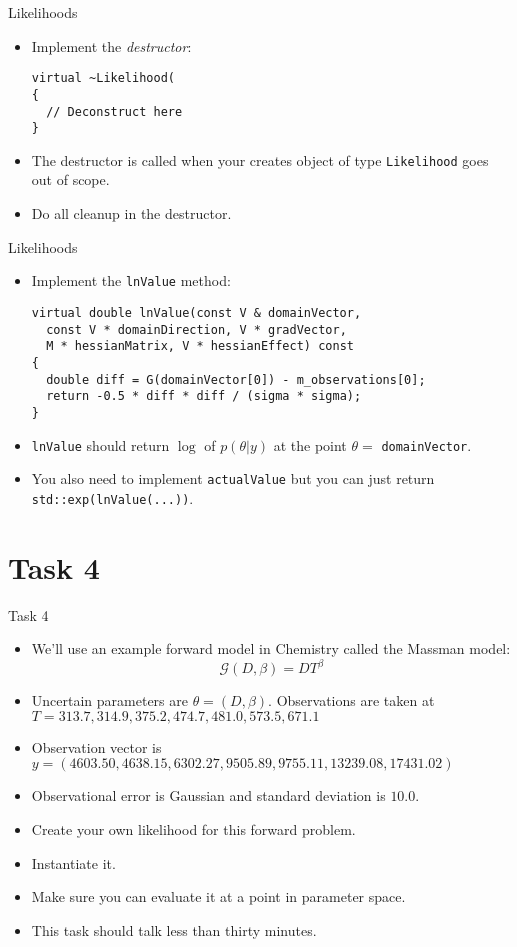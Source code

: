 \begin{frame}[fragile]{Likelihoods}
  \begin{itemize}
    \item Implement the \emph{destructor}:
      \begin{verbatim}
virtual ~Likelihood(
{
  // Deconstruct here
} \end{verbatim}
    \item The destructor is called when your creates object of type
      \texttt{Likelihood} goes out of scope.
    \item Do all cleanup in the destructor.
  \end{itemize}
\end{frame}

\begin{frame}[fragile]{Likelihoods}
  \begin{itemize}
    \item Implement the \texttt{lnValue} method:
      \begin{verbatim}
virtual double lnValue(const V & domainVector,
  const V * domainDirection, V * gradVector,
  M * hessianMatrix, V * hessianEffect) const
{
  double diff = G(domainVector[0]) - m_observations[0];
  return -0.5 * diff * diff / (sigma * sigma);
} \end{verbatim}
    \item \texttt{lnValue} should return $\log$ of $p(\theta | y)$ at the point
      $\theta =$ \texttt{domainVector}.
    \item You also need to implement \texttt{actualValue} but you can just
      return \texttt{std::exp(lnValue(...))}.
  \end{itemize}
\end{frame}

\section{Task 4}
\begin{frame}[fragile]{Task 4}
  \begin{itemize}
    \item We'll use an example forward model in Chemistry called the Massman
      model:
      \begin{equation*}
        \mathcal{G}(D, \beta) = D T^{\beta}
      \end{equation*}
    \item Uncertain parameters are $\theta = (D, \beta)$.  Observations are
      taken at $T = 313.7, 314.9, 375.2, 474.7, 481.0, 573.5, 671.1$
    \item Observation vector is $y = (4603.50, 4638.15, 6302.27, 9505.89,
      9755.11, 13239.08, 17431.02)$
    \item Observational error is Gaussian and standard deviation is $10.0$.
    \item Create your own likelihood for this forward problem.
    \item Instantiate it.
    \item Make sure you can evaluate it at a point in parameter space.
    \item This task should talk less than thirty minutes.
  \end{itemize}
\end{frame}
